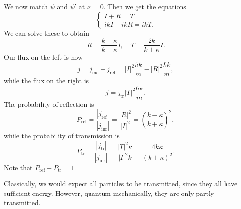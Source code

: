 \documentclass[a4paper]{article}
\begin{document}
\begin{enumerate}
    We now match $\psi$ and $\psi'$ at $x = 0$. Then we get the equations
    \[
      \begin{cases}
        I + R = T\\
        ikI - ikR = ikT.
      \end{cases}
    \]
    We can solve these to obtain
    \[
      R = \frac{k - \kappa}{k + \kappa}I,\quad T = \frac{2k}{k + \kappa} I.
    \]
    Our flux on the left is now
    \[
      j = j_{\mathrm{inc}} + j_{\mathrm{ref}} = |I|^2 \frac{\hbar k}{m} - |R|^2 \frac{\hbar k}{m},
    \]
    while the flux on the right is
    \[
      j = j_{\mathrm{tr}} |T|^2 \frac{\hbar \kappa}{m}.
    \]
    The probability of reflection is
    \[
      P_{\mathrm{ref}} = \frac{|j_{\mathrm{ref}}|}{|j_{\mathrm{inc}}|} = \frac{|R|^2}{|I|^2} = \left(\frac{k - \kappa}{k + \kappa}\right)^2,
    \]
    while the probability of transmission is
    \[
      P_{\mathrm{tr}} = \frac{|j_{\mathrm{tr}}|}{|j_{\mathrm{inc}}|} = \frac{|T|^2 \kappa}{|I|^2 k} = \frac{4k\kappa}{ (k + \kappa)^2}.
    \]
    Note that $P_{\mathrm{ref}} + P_{\mathrm{tr}} = 1$.

    Classically, we would expect all particles to be transmitted, since they all have sufficient energy. However, quantum mechanically, they are only partly transmitted.
\end{enumerate}
\end{document}
